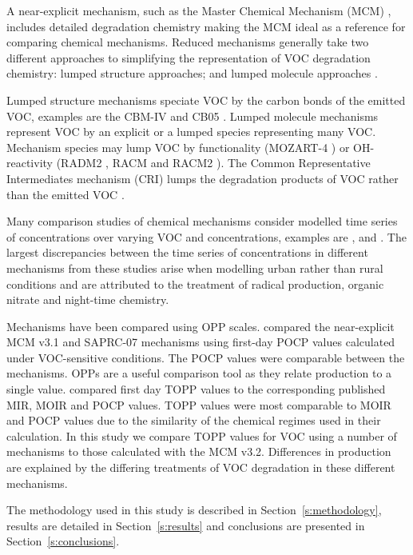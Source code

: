 A near-explicit mechanism, such as the Master Chemical Mechanism (MCM) \citep{Jenkin:2003, Saunders:2003, Bloss:2005}, includes detailed degradation chemistry making the MCM ideal as a reference for comparing chemical mechanisms.
Reduced mechanisms generally take two different approaches to simplifying the representation of VOC degradation chemistry: lumped structure approaches; and lumped molecule approaches \citep{Dodge:2000}. 

Lumped structure mechanisms speciate VOC by the carbon bonds of the emitted VOC, examples are the CBM-IV \citep{Gery:1989} and CB05 \citep{Yarwood:2005}.
Lumped molecule mechanisms represent VOC by an explicit or a lumped species representing many VOC. 
Mechanism species may lump VOC by functionality (MOZART-4 \citep{Emmons:2010}) or OH-reactivity (RADM2 \citep{Stockwell:1990}, RACM \citep{Stockwell:1997} and RACM2 \citep{Goliff:2013}).
The Common Representative Intermediates mechanism (CRI) lumps the degradation products of VOC rather than the emitted VOC \citep{Jenkin:2008}.

Many comparison studies of chemical mechanisms consider modelled time series of  concentrations over varying VOC and  concentrations, examples are \citet{Dunker:1984}, \citet{Kuhn:1998} and \citet{Emmerson:2009}.
The largest discrepancies between the time series of  concentrations in different mechanisms from these studies arise when modelling urban rather than rural conditions and are attributed to the treatment of radical production, organic nitrate and night-time chemistry.

Mechanisms have been compared using OPP scales.
\citet{Derwent:2010} compared the near-explicit MCM v3.1 and SAPRC-07 mechanisms using first-day POCP values calculated under VOC-sensitive conditions. 
The POCP values were comparable between the mechanisms.  
OPPs are a useful comparison tool as they relate  production to a single value. 
\citet{Butler:2011} compared first day TOPP values to the corresponding published MIR, MOIR and POCP values.
TOPP values were most comparable to MOIR and POCP values due to the similarity of the chemical regimes used in their calculation. 
In this study we compare TOPP values for VOC using a number of mechanisms to those calculated with the MCM v3.2. 
Differences in  production are explained by the differing treatments of VOC degradation in these different mechanisms.

The methodology used in this study is described in \mbox{Section \ref{s:methodology}}, results are detailed in \mbox{Section \ref{s:results}} and conclusions are presented in \mbox{Section \ref{s:conclusions}}.

